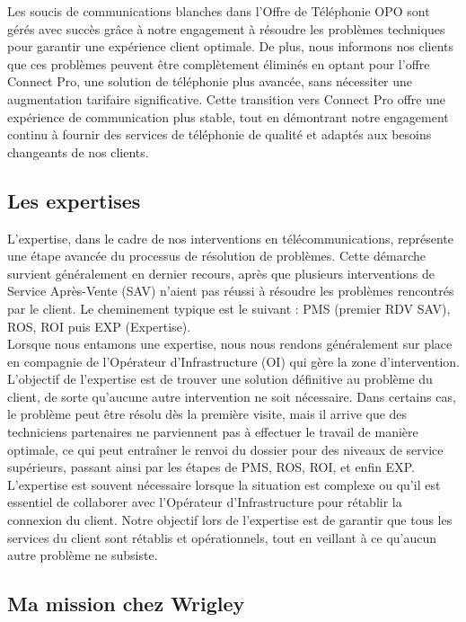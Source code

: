 \documentclass[12pt, a4paper]{article}
\begin{document}
Les soucis de communications blanches dans l'Offre de Téléphonie
OPO sont gérés avec succès grâce à notre engagement à résoudre
les problèmes techniques pour garantir une expérience client
optimale. De plus, nous informons nos clients que ces problèmes peuvent
être complètement éliminés en optant pour l'offre Connect Pro,
une solution de téléphonie plus avancée, sans nécessiter une
augmentation tarifaire significative. Cette transition vers
Connect Pro offre une expérience de communication plus stable,
tout en démontrant notre engagement continu à fournir des
services de téléphonie de qualité et adaptés aux besoins
changeants de nos clients.

\newpage
\subsection{Les expertises}
L'expertise, dans le cadre de nos interventions en télécommunications,
représente une étape avancée du processus de résolution de problèmes.
Cette démarche survient généralement en dernier recours, après que
plusieurs interventions de Service Après-Vente (SAV) n'aient pas
réussi à résoudre les problèmes rencontrés par le client. Le cheminement
typique est le suivant : PMS (premier RDV SAV), ROS, ROI puis EXP (Expertise).\\

Lorsque nous entamons une expertise, nous nous rendons généralement
sur place en compagnie de l'Opérateur d'Infrastructure (OI) qui gère
la zone d'intervention. L'objectif de l'expertise est de trouver
une solution définitive au problème du client, de sorte qu'aucune
autre intervention ne soit nécessaire. Dans certains cas, le problème
peut être résolu dès la première visite, mais il arrive que des
techniciens partenaires ne parviennent pas à effectuer le travail de
manière optimale, ce qui peut entraîner le renvoi du dossier pour
des niveaux de service supérieurs, passant ainsi par les étapes de
PMS, ROS, ROI, et enfin EXP.\\

L'expertise est souvent nécessaire lorsque la situation est complexe
ou qu'il est essentiel de collaborer avec l'Opérateur
d'Infrastructure pour rétablir la connexion du client. Notre objectif
lors de l'expertise est de garantir que tous les services du client
sont rétablis et opérationnels, tout en veillant à ce qu'aucun
autre problème ne subsiste. 

\newpage
\subsection{Ma mission chez Wrigley}
\end{document}
